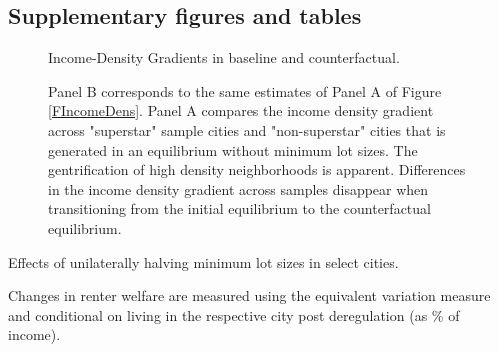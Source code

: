 \documentclass[12pt]{article}
\begin{document}
	\clearpage
	
	\subsection{Supplementary figures and tables}\label{Appendix:CounterfactualSupplmentaryFigures}
	\begin{figure}[htbp!]
		
		\caption{Income-Density Gradients in baseline and counterfactual.}\label{figure:gentrification_alternate}
		
		\caption*{Panel B corresponds to the same estimates of Panel A of Figure \ref{FIncomeDens}. Panel A compares the income density gradient across "superstar" sample cities and "non-superstar" cities that is generated in an equilibrium without minimum lot sizes. The gentrification of high density neighborhoods is apparent. Differences in the income density gradient across samples disappear when transitioning from the initial equilibrium to the counterfactual equilibrium.}
		
	\end{figure}
	
	
	\begin{landscape}
			\begin{table}[h]
			
			\centering
			\caption{Effects of unilaterally halving minimum lot sizes in select cities.}\label{table:ctfl_dereg_in_cities}
			\makebox[\textwidth]{	 }
			
			\caption*{Changes in renter welfare are measured using the equivalent variation measure and conditional on living in the respective city post deregulation (as \% of income).}
			
		\end{table}
	\end{landscape}
	
	
	
	
\end{document}
